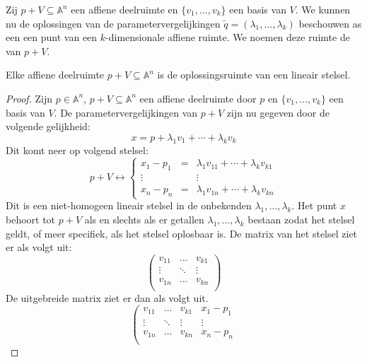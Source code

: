\documentclass[main.tex]{subfiles}
\begin{document}
\begin{de}
  Zij $p+V \subseteq \mathbb{A}^{n}$ een affiene deelruimte en $\{v_{1},\dotsc,v_{k}\}$ een basis van $V$.
  We kunnen nu de oplossingen van de parametervergelijkingen $\tilde{q} = (\lambda_{1},\dotsc,\lambda_{k})$ beschouwen as een een punt van een $k$-dimensionale affiene ruimte.
  We noemen deze ruimte de  van $p+V$.
\end{de}

\begin{st}
  Elke affiene deelruimte $p+V \subseteq \mathbb{A}^{n}$ is de oplossingsruimte van een lineair stelsel.
  
  \begin{proof}
    Zijn $p\in\mathbb{A}^{n}$, $p+V\subseteq \mathbb{A}^{n}$ een affiene deelruimte door $p$ en $\{v_{1},\dotsc,v_{k}\}$ een basis van $V$.
    De parametervergelijkingen van $p+V$ zijn nu gegeven door de volgende gelijkheid:
    \[
    x = p + \lambda_1v_1 + \dotsb + \lambda_{k}v_{k}  
    \]
    Dit komt neer op volgend stelsel:
    \[
      p+V \leftrightarrow
      \left\{
      \begin{array}{rcl}
      x_{1} -p_{1} &=& \lambda_{1}v_{11} + \dotsb + \lambda_{k}v_{k1}\\
      \vdots && \vdots\\
      x_{n} -p_{n} &=& \lambda_{1}v_{1n} + \dotsb + \lambda_{k}v_{kn}
      \end{array}
      \right.
    \] 
    Dit is een niet-homogeen lineair stelsel in de onbekenden $\lambda_{1},\dotsc,\lambda_{k}$.
    Het punt $x$ behoort tot $p+V$ als en slechts als er getallen $\lambda_{1},\dotsc,\lambda_{k}$ bestaan zodat het stelsel geldt, of meer specifiek, als het stelsel oplosbaar is.
    De matrix van het stelsel ziet er als volgt uit:
    \[
    \begin{pmatrix}
    v_{11} & \hdots & v_{k1}\\
    \vdots & \ddots & \vdots\\
    v_{1n} & \hdots & v_{kn}\\
    \end{pmatrix}
    \] 
    De uitgebreide matrix ziet er dan als volgt uit.
    \[
    \left(
    \begin{array}{ccc|c}
    v_{11} & \hdots & v_{k1} & x_{1} - p_{1}\\
    \vdots & \ddots & \vdots & \vdots\\
    v_{1n} & \hdots & v_{kn} & x_{n} - p_{n}\\
    \end{array}
\]
\end{proof}
\end{st}
\end{document}
